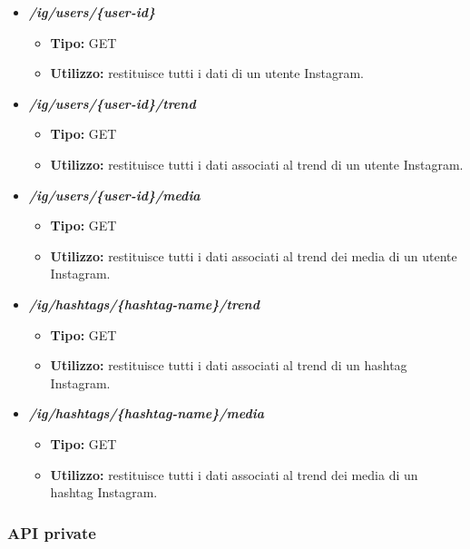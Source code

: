 \begin{itemize}
  \item \textit{\textbf{/ig/users/\{user-id\}}}
  \begin{itemize}
    \item \textbf{Tipo:} GET
    \item \textbf{Utilizzo:} restituisce tutti i dati di un utente Instagram.
  \end{itemize}
  \item \textit{\textbf{/ig/users/\{user-id\}/trend}}
  \begin{itemize}
    \item \textbf{Tipo:} GET
    \item \textbf{Utilizzo:} restituisce tutti i dati associati al trend di un utente Instagram.
  \end{itemize}
  \item \textit{\textbf{/ig/users/\{user-id\}/media}}
  \begin{itemize}
    \item \textbf{Tipo:} GET
    \item \textbf{Utilizzo:} restituisce tutti i dati associati al trend dei media di un utente Instagram.
  \end{itemize}
  \item \textit{\textbf{/ig/hashtags/\{hashtag-name\}/trend}}
  \begin{itemize}
    \item \textbf{Tipo:} GET
    \item \textbf{Utilizzo:} restituisce tutti i dati associati al trend di un hashtag Instagram.
  \end{itemize}
  \item \textit{\textbf{/ig/hashtags/\{hashtag-name\}/media}}
  \begin{itemize}
    \item \textbf{Tipo:} GET
    \item \textbf{Utilizzo:} restituisce tutti i dati associati al trend dei media di un hashtag Instagram.
  \end{itemize}

\end{itemize}

\subsubsection{API private}
\label{ssub:api_private}

